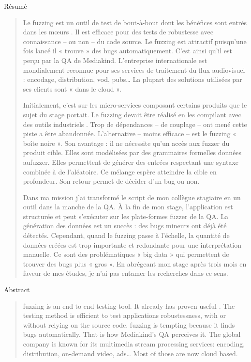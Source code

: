 \documentclass[
  11pt,
  english,
  paper=a4,
,captions=tableheading
]{scrartcl}
\begin{document}
{\fontsize{9}{10}\selectfont 
\begin{center}
Résumé
\end{center}

\begin{quotation}
Le fuzzing est un outil de test de bout-à-bout dont les bénéfices sont entrés dans les mœurs \cite{10.1145/96267.96279}. Il est efficace pour des tests de robustesse avec connaissance -- ou non -- du code source. Le fuzzing est attractif puisqu'une fois lancé il « trouve » des bugs automatiquement. C'est ainsi qu'il est perçu par la QA de Mediakind. L'entreprise internationale est mondialement reconnue pour ses services de traitement du flux audiovisuel : encodage, distribution, vod, pubs… La plupart des solutions utilisées par ses clients sont « dans le cloud ». 

Initialement, c'est sur les micro-services composant certains produits que le sujet du stage portait. Le fuzzing devait être réalisé en les compilant avec des outils industriels \cite{AFLplusplus-Woot20}. Trop de dépendances -- de couplage -- ont mené cette piste a être abandonnée. L'alternative -- moins efficace -- est le fuzzing « boîte noire ». Son avantage : il ne nécessite qu'un accès aux fuzzer du produit cible. Elles sont modélisées par des grammaires formelles données aufuzzer. Elles permettent de générer des entrées respectant une syntaxe combinée à de l'aléatoire. Ce mélange espère atteindre la cible en profondeur. Son retour permet de décider d'un bug ou non. 

Dans ma mission j'ai transformé le script de mon collègue stagiaire en un outil dans la manche de la QA. À la fin de mon stage, l'application est structurée et peut s'exécuter sur les plate-formes fuzzer de la QA. La génération des données est un succès : des bugs mineurs ont déjà été détectés. Cependant, quand le fuzzing passe à l'échelle, la quantité de données créées est trop importante et redondante pour une interprétation manuelle. Ce sont des problématiques « big data » qui permettent de trouver des bugs plus « gros ». En abrégeant mon stage après trois mois en faveur de mes études, je n'ai pas entamer les recherches dans ce sens.
\end{quotation}

\vspace*{2cm}

\begin{center}
Abstract
\end{center}

\begin{quotation}
fuzzing is an end-to-end testing tool. It already has proven useful \cite{10.1145/96267.96279}. The testing method is efficient to test applications robustessness, with or without relying on the source code. fuzzing is tempting because it finds bugs automatically. That is how Mediakind's QA perceives it. The global company is known for its multimedia stream processing services: encoding, distribution, on-demand video, ads… Most of those are now cloud based.


\end{quotation}}
\end{document}
